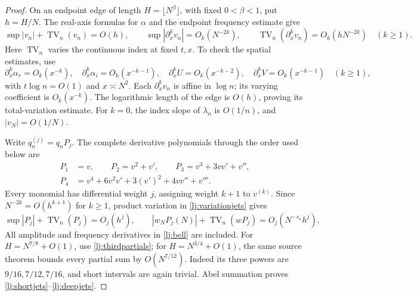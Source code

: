 \documentclass[11pt]{article}
\numberwithin{equation}{section}
\theoremstyle{definition}
\theoremstyle{remark}
\begin{document}
\begin{proof}
On an endpoint edge of length \(H=\lfloor N^\beta\rfloor\), with fixed
\(0<\beta<1\), put \(h=H/N\). The real-axis formulas for \(\alpha\)
and the endpoint frequency estimate give
\begin{equation}\label{lj:variationjets}
 \sup|v_n|+\operatorname{TV}_n(v_n)=O(h),\qquad
 \sup|\partial_x^kv_n|=O_k(N^{-2k}),\qquad
 \operatorname{TV}_n(\partial_x^kv_n)=O_k(hN^{-2k})
 \quad(k\ge1).
\end{equation}
Here \(\operatorname{TV}_n\) varies the continuous index at fixed
\(t,x\). To check the spatial estimates, use
\[
 \partial_x^k\alpha_r=O_k(x^{-k}),\quad
 \partial_x^k\alpha_i=O_k(x^{-k-1}),\quad
 \partial_x^kU=O_k(x^{-k-2}),\quad
 \partial_x^kV=O_k(x^{-k-1})\quad(k\ge1),
\]
with \(t\log n=O(1)\) and \(x\asymp N^2\).
Each \(\partial_x^kv_n\) is affine in \(\log n\); its varying
coefficient is \(O_k(x^{-k})\). The logarithmic length of the edge
is \(O(h)\), proving its total-variation estimate. For \(k=0\),
the index slope of \(\lambda_n\) is \(O(1/n)\), and
\(|v_N|=O(1/N)\).

Write \(q_n^{(j)}=q_nP_j\). The complete derivative polynomials through
the order used below are
\begin{align}
 P_1&=v,\qquad P_2=v^2+v',\qquad
 P_3=v^3+3vv'+v'',\nonumber\\
 P_4&=v^4+6v^2v'+3(v')^2+4vv''+v'''.\label{lj:bell}
\end{align}
Every monomial has differential weight \(j\), assigning weight \(k+1\)
to \(v^{(k)}\). Since \(N^{-2k}=O(h^{k+1})\) for \(k\ge1\),
product variation in \eqref{lj:variationjets} gives
\[
 \sup|P_j|+\operatorname{TV}_n(P_j)=O_j(h^j),\qquad
 |w_NP_j(N)|+\operatorname{TV}_n(wP_j)
             =O_j(N^{-s_\kappa}h^j).
\]
All amplitude and frequency derivatives in \eqref{lj:bell} are included.
For \(H=N^{7/8}+O(1)\), use \eqref{lj:thirdpartials}; for
\(H=N^{3/4}+O(1)\), the same source theorem bounds every partial sum
by \(O(N^{7/12})\). Indeed its three powers are
\(9/16,7/12,7/16\), and short intervals are again trivial.
Abel summation proves \eqref{lj:shortjets}--\eqref{lj:deepjets}.
\end{proof}
\end{document}
